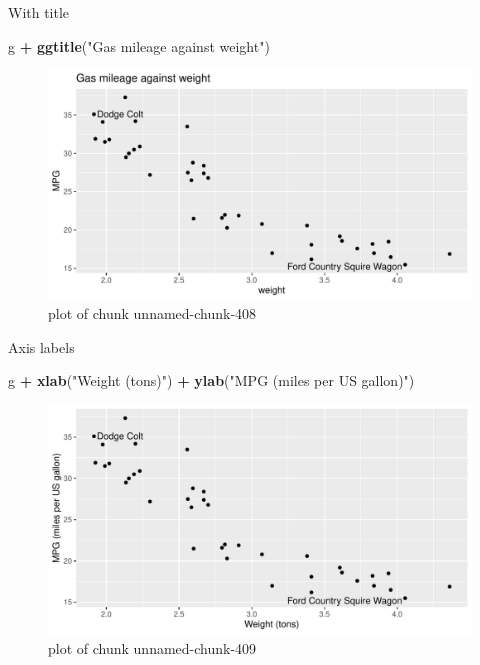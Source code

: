 \documentclass[ignorenonframetext,]{beamer}
\newenvironment{Shaded}{\begin{snugshade}}{\end{snugshade}}
\newcommand{\KeywordTok}[1]{\textcolor[rgb]{0.13,0.29,0.53}{\textbf{#1}}}
\newcommand{\NormalTok}[1]{#1}
\newcommand{\OperatorTok}[1]{\textcolor[rgb]{0.81,0.36,0.00}{\textbf{#1}}}
\newcommand{\StringTok}[1]{\textcolor[rgb]{0.31,0.60,0.02}{#1}}
\begin{document}
\begin{frame}[fragile]{With title}
\protect\hypertarget{with-title}{}

\begin{Shaded}
\begin{Highlighting}[]
\NormalTok{g }\OperatorTok{+}\StringTok{ }\KeywordTok{ggtitle}\NormalTok{(}\StringTok{"Gas mileage against weight"}\NormalTok{)}
\end{Highlighting}
\end{Shaded}

\begin{figure}
\centering
\includegraphics{figure/unnamed-chunk-408-1.pdf}
\caption{plot of chunk unnamed-chunk-408}
\end{figure}

\end{frame}

\begin{frame}[fragile]{Axis labels}
\protect\hypertarget{axis-labels}{}

\begin{Shaded}
\begin{Highlighting}[]
\NormalTok{g }\OperatorTok{+}\StringTok{ }\KeywordTok{xlab}\NormalTok{(}\StringTok{"Weight (tons)"}\NormalTok{) }\OperatorTok{+}\StringTok{ }\KeywordTok{ylab}\NormalTok{(}\StringTok{"MPG (miles per US gallon)"}\NormalTok{)}
\end{Highlighting}
\end{Shaded}

\begin{figure}
\centering
\includegraphics{figure/unnamed-chunk-409-1.pdf}
\caption{plot of chunk unnamed-chunk-409}
\end{figure}

\end{frame}
\end{document}
